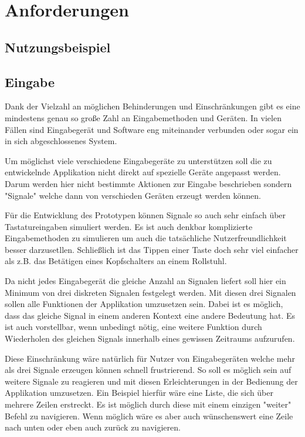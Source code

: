 \section{Anforderungen}

	\subsection{Nutzungsbeispiel}
    \newpage
    
	\subsection{Eingabe}
    	Dank der Vielzahl an möglichen Behinderungen und Einschränkungen gibt es eine mindestens genau so große Zahl an Eingabemethoden und Geräten. In vielen Fällen sind Eingabegerät und Software eng miteinander verbunden oder sogar ein in sich abgeschlossenes System.
        
        Um möglichst viele verschiedene Eingabegeräte zu unterstützen soll die zu entwickelnde Applikation nicht direkt auf spezielle Geräte angepasst werden. Darum werden hier nicht bestimmte Aktionen zur Eingabe beschrieben sondern "Signale" welche dann von verschieden Geräten erzeugt werden können.
        
        Für die Entwicklung des Prototypen können Signale so auch sehr einfach über Tastatureingaben simuliert werden. Es ist auch denkbar komplizierte Eingabemethoden zu simulieren um auch die tatsächliche Nutzerfreundlichkeit besser darzusetllen. Schließlich ist das Tippen einer Taste doch sehr viel einfacher als z.B. das Betätigen eines Kopfschalters an einem Rollstuhl. 
        
        Da nicht jedes Eingabegerät die gleiche Anzahl an Signalen liefert soll hier ein Minimum von drei diskreten Signalen festgelegt werden. Mit diesen drei Signalen sollen alle Funktionen der Applikation umzusetzen sein. Dabei ist es möglich, dass das gleiche Signal in einem anderen Kontext eine andere Bedeutung hat. Es ist auch vorstellbar, wenn unbedingt nötig, eine weitere Funktion durch Wiederholen des gleichen Signals innerhalb eines gewissen Zeitraums aufzurufen.
        
        Diese Einschränkung wäre natürlich für Nutzer von Eingabegeräten welche mehr als drei Signale erzeugen können schnell frustrierend. So soll es möglich sein auf weitere Signale zu reagieren und mit diesen Erleichterungen in der Bedienung der Applikation umzusetzen. Ein Beispiel hierfür wäre eine Liste, die sich über mehrere Zeilen erstreckt. Es ist möglich durch diese mit einem einzigen "weiter" Befehl zu navigieren. Wenn möglich wäre es aber auch wünschenswert eine Zeile nach unten oder eben auch zurück zu navigieren.
        
